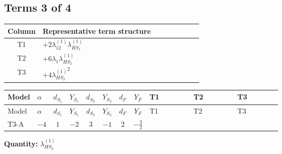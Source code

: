 \documentclass[8pt]{article}
\begin{document}
\begin{landscape}
\subsection*{Terms 3 of 4}
\begin{center}
\begin{tabular}{@{}c >{\raggedright\arraybackslash}p{0.82\linewidth}@{}}
\toprule
Column & Representative term structure \\
\midrule
T1 & \(\displaystyle +2 {\lambda_{12}^{(1)}} {\lambda_{HS_1}^{(1)}}\) \\
\midrule
T2 & \(\displaystyle +6 {\lambda_1} {\lambda_{HS_2}^{(1)}}\) \\
\midrule
T3 & \(\displaystyle +4 {\lambda_{HS_2}^{(1)}}^2\) \\
\midrule
\bottomrule
\end{tabular}
\end{center}
\smallskip
\tiny
\begin{longtable}{@{}llcccccc >{\raggedright\arraybackslash}p{0.21\linewidth} >{\raggedright\arraybackslash}p{0.21\linewidth} >{\raggedright\arraybackslash}p{0.21\linewidth}@{}}
\toprule
Model & $\alpha$ & $d_{S_1}$ & $Y_{S_1}$ & $d_{S_2}$ & $Y_{S_2}$ & $d_F$ & $Y_F$ & T1 & T2 & T3 \\
\midrule
\endfirsthead
\toprule
Model & $\alpha$ & $d_{S_1}$ & $Y_{S_1}$ & $d_{S_2}$ & $Y_{S_2}$ & $d_F$ & $Y_F$ & T1 & T2 & T3 \\
\midrule
\endhead
T3-A & $-4$ & $1$ & $-2$ & $3$ & $-1$ & $2$ & $-\frac{3}{2}$ & \scriptsize\adjustbox{max width=\linewidth}{$\begin{gathered} +2 {\lambda_{12}^{(1)}} {\lambda_{HS_1}^{(1)}}\end{gathered}$} & \scriptsize\adjustbox{max width=\linewidth}{$\begin{gathered} +6 {\lambda_1} {\lambda_{HS_2}^{(1)}}\end{gathered}$} & \scriptsize\adjustbox{max width=\linewidth}{$\begin{gathered} +4 {\lambda_{HS_2}^{(1)}}^2\end{gathered}$} \\
\midrule
\bottomrule
\end{longtable}
\clearpage
\noindent\textbf{Quantity: }$\lambda_{HS_2}^{(1)}$\par\smallskip

\end{landscape}
\end{document}
